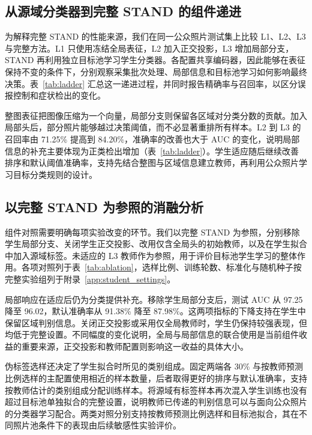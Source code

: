 \documentclass[11pt,a4paper,UTF8,fontset=windows,scheme=plain]{ctexart}
\begin{document}
\subsection{从源域分类器到完整 STAND 的组件递进}
为解释完整 STAND 的性能来源，我们在同一公众照片测试集上比较 L1、L2、L3 与完整方法。L1 只使用冻结全局表征，L2 加入正交投影，L3 增加局部分支，STAND 再利用独立目标池学习学生分类器。各配置共享编码器，因此能够在表征保持不变的条件下，分别观察采集批次处理、局部信息和目标池学习如何影响最终决策。表~\ref{tab:ladder} 汇总这一递进过程，并同时报告精确率与召回率，以区分误报控制和症状检出的变化。



整图表征把图像压缩为一个向量，局部分支则保留各区域对分类分数的贡献。加入局部头后，部分照片能够越过决策阈值，而不必显著重排所有样本。L2 到 L3 的召回率由 71.25\% 提高到 84.20\%，准确率的改善也大于 AUC 的变化，说明局部信息的补充主要体现为正类检出增加（表~\ref{tab:ladder}）。学生适应随后继续改善排序和默认阈值准确率，支持先结合整图与区域信息建立教师，再利用公众照片学习目标分类规则的设计。

\subsection{以完整 STAND 为参照的消融分析}
组件对照需要明确每项实验改变的环节。我们以完整 STAND 为参照，分别移除学生局部分支、关闭学生正交投影、改用仅含全局头的初始教师，以及在学生拟合中加入源域标签。未适应的 L3 教师作为参照，用于评价目标池学生学习的整体作用。各项对照列于表~\ref{tab:ablation}，选样比例、训练轮数、标准化与随机种子按完整实验组列于附录~\ref{app:student_settings}。



局部响应在适应后仍为分类提供补充。移除学生局部分支后，测试 AUC 从 97.25 降至 96.02，默认准确率从 91.38\% 降至 87.98\%。这两项指标的下降支持在学生中保留区域判别信息。关闭正交投影或采用仅全局教师时，学生仍保持较强表现，但均低于完整设置。不同幅度的变化说明，全局与局部信息的联合使用是当前组件收益的重要来源，正交投影和教师配置则影响这一收益的具体大小。

伪标签选样还决定了学生拟合时所见的类别组成。固定两端各 30\% 与按教师预测比例选样的主配置使用相近的样本数量，后者取得更好的排序与默认准确率，支持按教师估计的类别组成分配训练样本。将源域有标签样本再次混入学生训练也没有超过目标池单独拟合的完整设置，说明教师已传递的判别信息可以与面向公众照片的分类器学习配合。两类对照分别支持按教师预测比例选样和目标池拟合，其在不同照片池条件下的表现由后续敏感性实验评价。
\end{document}
